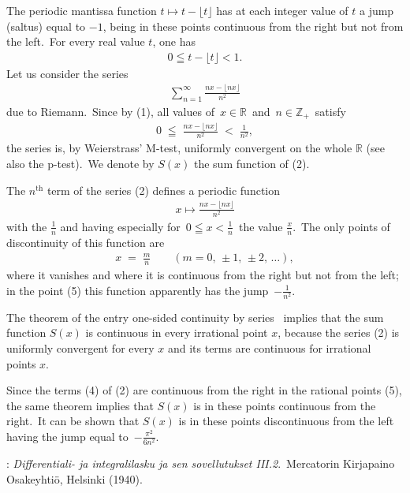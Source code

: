 \documentclass[12pt]{article}
\theoremstyle{definition}
\begin{document}
 

The periodic mantissa function \;$t \mapsto t\!-\!\lfloor{t}\rfloor$\; has at each integer value of $t$ a jump (saltus) equal to $-1$, being in these points continuous from the right but not from the left.\, For every real value $t$, one has
\begin{align}
0 \leqq t\!-\!\lfloor{t}\rfloor < 1.
\end{align}
Let us consider the series
\begin{align}
\sum_{n=1}^\infty\frac{nx\!-\!\lfloor{nx}\rfloor}{n^2}
\end{align}
due to Riemann.\, Since by (1), all values of\, $x \in \mathbb{R}$\, and\, $n \in \mathbb{Z}_+$\, satisfy
\begin{align}
0 \;\leqq\; \frac{nx\!-\!\lfloor{nx}\rfloor}{n^2} \;<\; \frac{1}{n^2},
\end{align}
the series is, by Weierstrass' M-test, uniformly convergent on the whole $\mathbb{R}$ (see also the p-test).\, We denote by $S(x)$ the sum function of (2).

The $n^\mathrm{th}$ term of the series (2) defines a periodic function
\begin{align}
x \mapsto \frac{nx\!-\!\lfloor{nx}\rfloor}{n^2}
\end{align}
with the  $\frac{1}{n}$ and having especially for\, $0 \leqq x < \frac{1}{n}$\, the value $\frac{x}{n}$.\, The only points of discontinuity of this function are
\begin{align}
x \;=\; \frac{m}{n} \qquad (m = 0,\,\pm1,\,\pm2,\,\ldots),
\end{align}
where it vanishes and where it is continuous from the right but not from the left; in the point (5) this function apparently has the jump\, $\displaystyle-\frac{1}{n^2}$.

The theorem of the entry one-sided continuity by series \, implies that the sum function $S(x)$ is continuous in every irrational point $x$, because the series (2) is uniformly convergent for every $x$ and its terms are continuous for irrational points $x$.

Since the terms (4) of (2) are continuous from the right in the rational points (5), the same theorem implies that 
$S(x)$ is in these points continuous from the right.\, It can be shown that $S(x)$ is in these points discontinuous from the left having the jump equal to\, $\displaystyle-\frac{\pi^2}{6n^2}$.

\begin{thebibliography}{8}
: {\em Differentiali- ja integralilasku
ja sen sovellutukset III.2}.\, Mercatorin Kirjapaino Osakeyhti\"o, Helsinki (1940).
\end{thebibliography}
\end{document}

